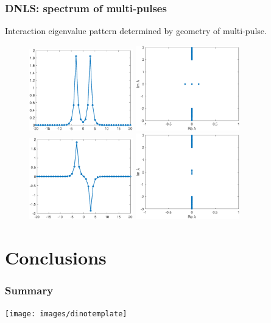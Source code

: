 \documentclass[16pt]{beamer}
\begin{document}
\begin{frame}
\frametitle{DNLS: spectrum of multi-pulses}
\fontsize{16}{7.2}\selectfont
Interaction eigenvalue pattern determined by geometry of multi-pulse.
\begin{figure}[H]
\centering
\includegraphics[width=4.5cm]{images/dnlsPP.eps}
\includegraphics[width=4.5cm]{images/dnlsPPeig.eps}
\includegraphics[width=4.5cm]{images/dnlsPM.eps}
\includegraphics[width=4.5cm]{images/dnlsPMeig.eps}
\end{figure}
\end{frame}

\section{Conclusions}

\begin{frame}
	\frametitle{Summary}
	\begin{center}
		\texttt{[image: images/dinotemplate]}
	\end{center}
\end{frame}
\end{document}
